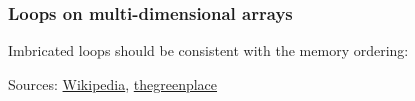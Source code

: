 \begin{frame}[fragile]
\begin{figure}
    \end{figure}

\end{frame}

\begin{frame}[fragile]
    \frametitle{Loops on multi-dimensional arrays}
    Imbricated loops should be consistent with the memory ordering:

    
    
    \vspace{1em}

    Sources: \href{https://en.wikipedia.org/wiki/Row-_and_column-major_order}{Wikipedia}, \href{https://eli.thegreenplace.net/2015/memory-layout-of-multi-dimensional-arrays/}{thegreenplace}

\end{frame}
